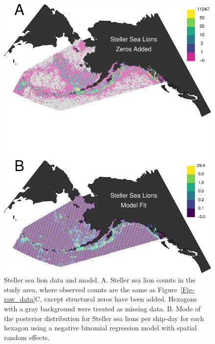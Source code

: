 \documentclass[11pt, titlepage]{article}
\begin{document}
\begin{spacing}{1.9}
\begin{flushleft}
\begin{figure}[H]
  \begin{center}
  \includegraphics[width=.75\linewidth]{Fig-SeaLionFit}
  \end{center}
  \caption{Steller sea lion data and model. A. Steller sea lion counts in the study area, where observed counts are the same as Figure~\ref{Fig-raw_data}C, except structural zeros have been added. Hexagons with a gray background were treated as missing data. B. Mode of the posterior distribution for Steller sea lions per ship-day for each hexagon using a negative binomial regression model with spatial random effects.  \label{Fig-SeaLionFit}}         
\end{figure} 


\end{flushleft}
\end{spacing}
\end{document}
